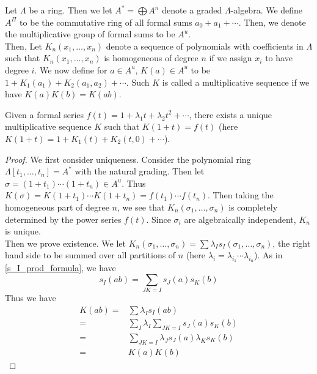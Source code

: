 	\begin{defn}
		Let $\Lambda$ be a ring. Then we let $A^*=\bigoplus A^n$ denote a graded $\Lambda$-algebra. We define $A^\Pi$ to be the commutative ring of all formal sums $a_0+a_1+\cdots$. Then, we denote the multiplicative group of formal sums to be $A^u$. \\
		Then, Let $K_n(x_1,\dots,x_n)$ denote a sequence of polynomials with coefficients in $\Lambda$ such that $K_n(x_1,\dots,x_n)$ is homogeneous of degree $n$ if we assign $x_i$ to have degree $i$. We now define for $a\in A^u$, $K(a)\in A^u$ to be $1+K_1(a_1)+K_2(a_1,a_2)+\cdots$. Such $K$ is called a multiplicative sequence if we have $K(a)K(b)=K(ab)$. 
	\end{defn}

	\begin{lemma}\label{Char_mult_seq}
		Given a formal series $f(t)=1+\lambda_1t+\lambda_2t^2+\cdots$, there exists a unique multiplicative sequence $K$ such that $K(1+t)=f(t)$ (here $K(1+t)=1+K_1(t)+K_2(t,0)+\cdots$). 
	\end{lemma}
	\begin{proof}
		We first consider uniqueness. Consider the polynomial ring $\Lambda[t_1,\dots,t_n]=A^*$ with the natural grading. Then let $\sigma=(1+t_1)\cdots(1+t_n)\in A^u$. Thus $K(\sigma)=K(1+t_1)\cdots K(1+t_n)=f(t_1)\cdots f(t_n)$. Then taking the homogeneous part of degree $n$, we see that $K_n(\sigma_1,\dots,\sigma_n)$ is completely determined by the power series $f(t)$. Since $\sigma_i$ are algebraically independent, $K_n$ is unique. \\
		Then we prove existence. We let $K_n(\sigma_1,\dots,\sigma_n)=\sum\lambda_Is_I(\sigma_1,\dots,\sigma_n)$, the right hand side to be summed over all partitions of $n$ (here $\lambda_i=\lambda_{i_1}\cdots\lambda_{i_n}$). As in \cref{s_I_prod_formula}, we have
		\[ s_I(ab)=\sum_{JK=I}s_J(a)s_K(b) \]
		Thus we have
		\begin{align*}
			K(ab)=&\sum\lambda_I s_I(ab) \\
			=&\sum_I\lambda_I\sum_{JK=I}s_J(a)s_K(b) \\
			=&\sum_{JK=I}\lambda_Js_J(a)\lambda_Ks_K(b) \\
			=&K(a)K(b)
		\end{align*}
	\end{proof}

